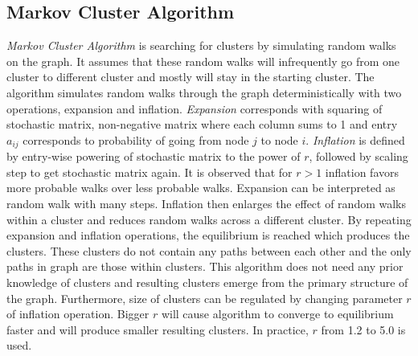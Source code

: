 \subsection{Markov Cluster Algorithm}
\emph{Markov Cluster Algorithm} \cite{} is searching for clusters by simulating random walks on the graph.
It assumes that these random walks will infrequently go from one cluster to different cluster and mostly will stay in the starting cluster.
The algorithm simulates random walks through the graph deterministically with two operations, expansion and inflation.
\emph{Expansion} corresponds with squaring of stochastic matrix, non-negative matrix where each column sums to 1 and entry $a_{ij}$ corresponds to probability of going from node $j$ to node $i$.
\emph{Inflation} is defined by entry-wise powering of stochastic matrix to the power of $r$, followed by scaling step to get stochastic matrix again.
It is observed that for $r>1$ inflation favors more probable walks over less probable walks.
Expansion can be interpreted as random walk with many steps.
Inflation then enlarges the effect of random walks within a cluster and reduces random walks across a different cluster.
By repeating expansion and inflation operations, the equilibrium is reached which produces the clusters.
These clusters do not contain any paths between each other and the only paths in graph are those within clusters.
This algorithm does not need any prior knowledge of clusters and resulting clusters emerge from the primary structure of the graph.
Furthermore, size of clusters can be regulated by changing parameter $r$ of inflation operation.
Bigger $r$ will cause algorithm to converge to equilibrium faster and will produce smaller resulting clusters.
In practice, $r$ from 1.2 to 5.0 is used.